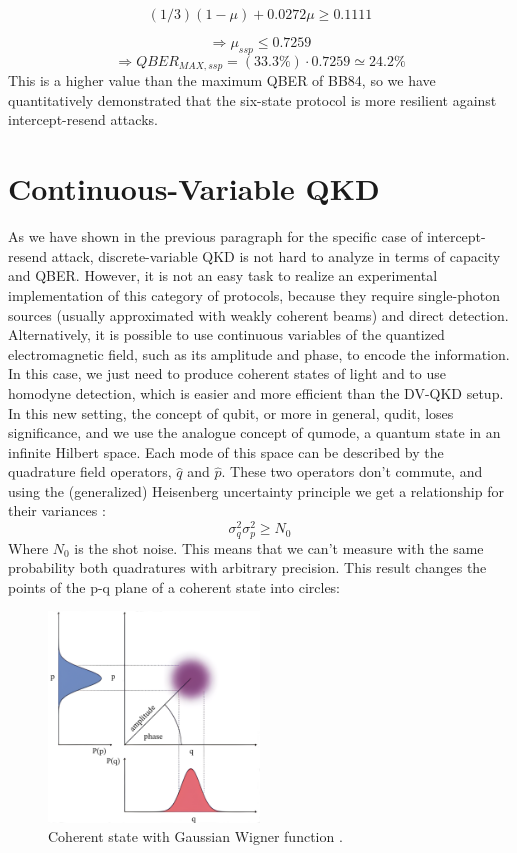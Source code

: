 \documentclass[journal, letterpaper]{IEEEtran}
\begin{document}
\[(1/3)(1-\mu)+0.0272\mu \geq 0.1111\]

\[\Rightarrow \mu_{ssp} \leq 0.7259\]
\[\Rightarrow QBER_{MAX,ssp} = (33.3\%)\cdot0.7259 \simeq 24.2\% \]
This is a higher value than the maximum QBER of BB84, so we have quantitatively demonstrated that the six-state protocol is more resilient against intercept-resend attacks. 
\\ 

\section{Continuous-Variable QKD}
As we have shown in the previous paragraph for the specific case of intercept-resend attack, discrete-variable QKD is not hard to analyze in terms of capacity and QBER. However, it is not an easy task to realize an experimental implementation of this category of protocols, because they require single-photon sources (usually approximated with weakly coherent beams) and direct detection. Alternatively, it is possible to use continuous variables of the quantized electromagnetic field, such as its amplitude and phase, to encode the information. In this case, we just need to produce coherent states of light and to use homodyne detection, which is easier and more efficient than the DV-QKD setup. In this new setting, the concept of qubit, or more in general, qudit, loses significance, and we use the analogue concept of qumode, a quantum state in an infinite Hilbert space. Each mode of this space can be described by the quadrature field operators, $\hat{q}$ and $\hat{p}$. These two operators don't commute, and using the (generalized) Heisenberg uncertainty principle we get a relationship for their variances \cite{wolf,griffiths}: 
\[\sigma_q^2\sigma_p^2 \geq N_0\]
Where $N_0$ is the shot noise. This means that we can't measure with the same probability both quadratures with arbitrary precision. This result changes the points of the p-q plane 
of a coherent state into circles: 

\begin{figure}[!h]
    \centering
    \includegraphics[width=0.5\textwidth]{Images/blur.png}
        \caption{Coherent state with Gaussian Wigner function \cite{wolf}.}
     \label{fig:quadtree}
\end{figure}
\end{document}
